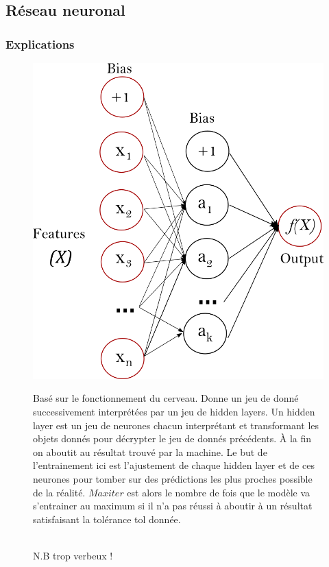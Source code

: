 \documentclass{beamer}
\begin{document}
\subsection{Réseau neuronal}
\begin{frame}
	\frametitle{Explications}
	\begin{figure}[t]
		\centering
		\begin{minipage}{0.5\textwidth}
			\includegraphics[scale=0.15]{nn_sk}
		\end{minipage}
		\begin{minipage}{0.3\textwidth}
			\tiny{Basé sur le fonctionnement du cerveau. Donne un jeu de donné successivement interprétées par un jeu de hidden layers. Un hidden layer est un jeu de neurones chacun interprétant et transformant les objets donnés pour décrypter le jeu de donnés précédents. À la fin on aboutit au résultat trouvé par la machine. Le but de l'entrainement ici est l'ajustement de chaque hidden layer et de ces neurones pour tomber sur des prédictions les plus proches possible de la réalité. $Maxiter$ est alors le nombre de fois que le modèle va s'entrainer au maximum si il n’a pas réussi à aboutir à un résultat satisfaisant la tolérance tol donnée.}
		\end{minipage}
	\\
	\alert{N.B trop verbeux !}
	\end{figure}
\end{frame}
\end{document}
